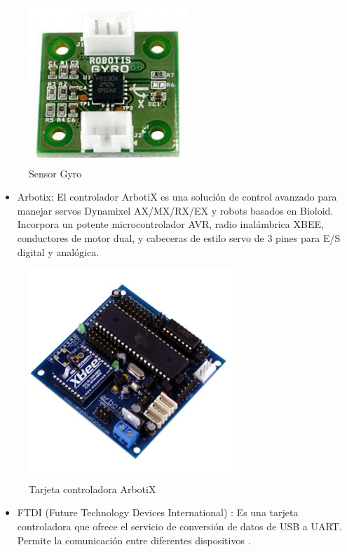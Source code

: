\begin{figure}[hbtp]
\centering
\includegraphics[scale=0.5]{imagenes/gyro.jpg}
\caption{Sensor Gyro}
\end{figure}

\begin{itemize}
\item Arbotix: El controlador ArbotiX es una solución de control avanzado para manejar servos Dynamixel AX/MX/RX/EX y robots
basados en Bioloid. Incorpora un potente microcontrolador AVR, radio inalámbrica XBEE, conductores de motor dual, y cabeceras
de estilo servo de 3 pines para E/S digital y analógica.\cite{arbotix}

\end{itemize}

\begin{figure}[hbtp]
\centering
\includegraphics[scale=0.5]{imagenes/ARBOTIX.JPG}
\caption{Tarjeta controladora ArbotiX}
\end{figure}

\begin{itemize}
\item FTDI (Future Technology Devices International) : Es una tarjeta controladora que ofrece el servicio de conversión de 
datos de USB a UART. Permite la comunicación entre diferentes dispositivos \cite{ftdi}.

\end{itemize}

